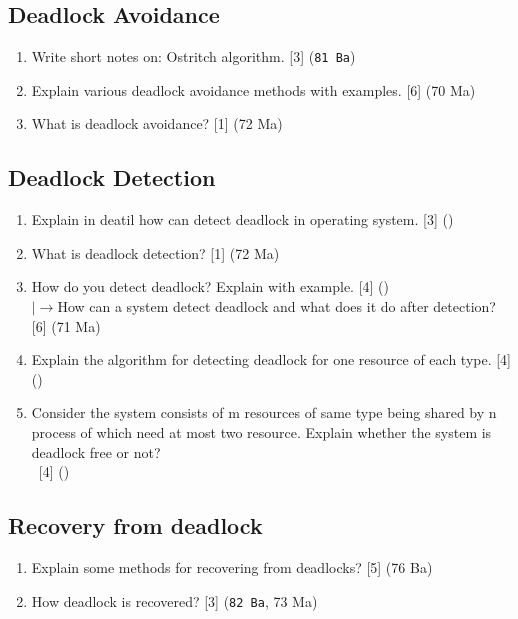 \documentclass[12pt]{article}
\newcommand{\lb}{\\$\left|\rightarrow\right.$}
\newcommand{\enter}{\\\textcolor{white}{1}}
\begin{document}
	\subsection{Deadlock Avoidance}
		\begin{enumerate}[noitemsep, topsep=0pt]
			\item Write short notes on: Ostritch algorithm. \hfill [3] (\texttt{81 Ba})

			\item Explain various deadlock avoidance methods with examples. \hfill [6] (70 Ma)

			\item What is deadlock avoidance? \hfill [1] (72 Ma)
		\end{enumerate}

	\subsection{Deadlock Detection}
		\begin{enumerate}[noitemsep, topsep=0pt]
			\item Explain in deatil how can detect deadlock in operating system. \hfill [3] ()

			\item What is deadlock detection? \hfill [1] (72 Ma)

			\item How do you detect deadlock? Explain with example. \hfill [4] ()
			\lb How can a system detect deadlock and what does it do after detection? \hfill [6] (71 Ma)

			\item Explain the algorithm for detecting deadlock for one resource of each type. \hfill [4] ()

			\item Consider the system consists of m resources of same type being shared by n process of which need at most two resource. Explain whether the system is deadlock free or not?
			\enter\hfill [4] ()
		\end{enumerate}

	\subsection{Recovery from deadlock}
		\begin{enumerate}[noitemsep, topsep=0pt]
			\item Explain some methods for recovering from deadlocks? \hfill [5] (76 Ba)

			\item How deadlock is recovered? \hfill [3] (\texttt{82 Ba}, 73 Ma)
		\end{enumerate}
\end{document}
